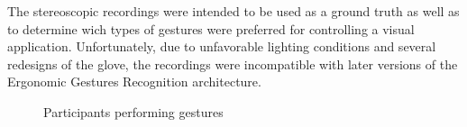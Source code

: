 The stereoscopic recordings were intended to be used as a ground truth as well as to determine wich types of gestures were preferred for controlling a visual application. Unfortunately, due to unfavorable lighting conditions and several redesigns of the glove, the recordings were incompatible with later versions of the Ergonomic Gestures Recognition architecture.
\begin{figure}[H]
   \centering
      \hspace{0.01\textwidth}
      \hspace{0.01\textwidth}
      \hspace{0.01\textwidth}
   \caption{Participants performing gestures}
   \label{fig:survey}
\end{figure}

